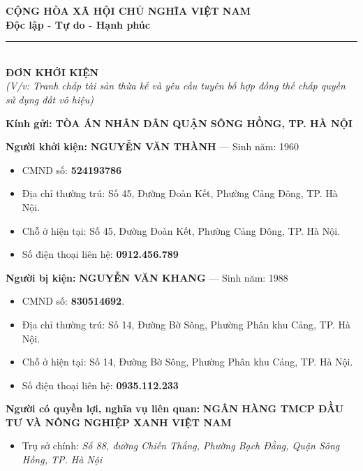 \documentclass[12pt,a4paper]{article}
\begin{document}
\begin{center}
    \fontsize{11pt}{13pt}\selectfont
    \textbf{CỘNG HÒA XÃ HỘI CHỦ NGHĨA VIỆT NAM}\\
    \textbf{Độc lập - Tự do - Hạnh phúc}\\[-0.2em]
    \rule{4cm}{0.6pt}\\[0.5cm]
    \textbf{\Large ĐƠN KHỞI KIỆN}\\[0.15cm]
    \textit{(V/v: Tranh chấp tài sản thừa kế và yêu cầu tuyên bố hợp đồng thế chấp quyền sử dụng đất vô hiệu)}
\end{center}
\vspace{0.3cm}

\textbf{Kính gửi:} \textbf{TÒA ÁN NHÂN DÂN QUẬN SÔNG HỒNG, TP. HÀ NỘI}


\textbf{Người khởi kiện:} \textbf{NGUYỄN VĂN THÀNH} — Sinh năm: 1960

\begin{itemize}[leftmargin=*, itemsep=2pt, topsep=2pt, parsep=0pt]
  \item CMND số: \textbf{524193786}
  \item Địa chỉ thường trú: Số 45, Đường Đoàn Kết, Phường Cảng Đông, TP. Hà Nội.
  \item Chỗ ở hiện tại: Số 45, Đường Đoàn Kết, Phường Cảng Đông, TP. Hà Nội.
  \item Số điện thoại liên hệ: \textbf{0912.456.789}

\end{itemize}
\textbf{Người bị kiện:} \textbf{NGUYỄN VĂN KHANG} — Sinh năm: 1988

\begin{itemize}[leftmargin=*, itemsep=2pt, topsep=2pt, parsep=0pt]
  \item CMND số: \textbf{830514692}.
  \item Địa chỉ thường trú: Số 14, Đường Bờ Sông, Phường Phân khu Cảng, TP. Hà Nội.
  \item Chỗ ở hiện tại: Số 14, Đường Bờ Sông, Phường Phân khu Cảng, TP. Hà Nội.
  \item Số điện thoại liên hệ: \textbf{0935.112.233}

\end{itemize}
\textbf{Người có quyền lợi, nghĩa vụ liên quan:} \textbf{NGÂN HÀNG TMCP ĐẦU TƯ VÀ NÔNG NGHIỆP XANH VIỆT NAM}

\begin{itemize}[leftmargin=*, itemsep=2pt, topsep=2pt, parsep=0pt]
  \item Trụ sở chính: \textit{Số 88, đường Chiến Thắng, Phường Bạch Đằng, Quận Sông Hồng, TP. Hà Nội}


\end{itemize}
\end{document}
